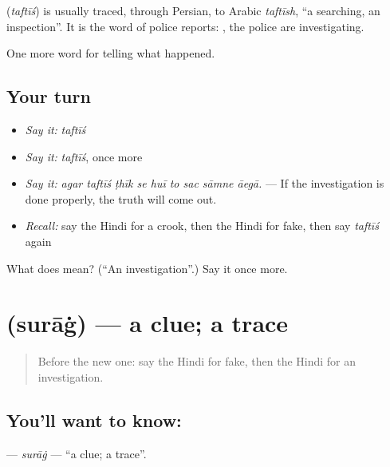 \begin{cousinweb}
\textbf{} (\emph{taftīś}) is usually traced, through Persian, to Arabic \emph{taftīsh}, \textquotedblleft{}a searching, an inspection\textquotedblright{}. It is the word of police reports: \textbf{    }, the police are investigating.
\end{cousinweb}

\begin{grammarlens}[title={What you've built}]
One more word for telling what happened.
\end{grammarlens}

\subsection*{Your turn}
\begin{itemize}
\raggedright
  \item \emph{Say it:} \emph{taftīś}
  \item \emph{Say it:} \emph{taftīś}, once more
  \item \emph{Say it:} \emph{agar taftīś ṭhīk se huī to sac sāmne āegā.} — If the investigation is done properly, the truth will come out.
  \item \emph{Recall:} say the Hindi for a crook, then the Hindi for fake, then say \emph{taftīś} again
\end{itemize}

\begin{tcolorbox}[breakable,colback=teal!4,colframe=teal!35!black,title={Before you move on}]
What does  mean? (\textquotedblleft{}An investigation\textquotedblright{}.) Say it once more.
\end{tcolorbox}
\section[\texorpdfstring{\hi{सुराग़} (surāġ)}{सुराग़ (surāġ)}]{ (surāġ) — a clue; a trace}

\label{lesson:HI-C294-surag}



\begin{quote}
Before the new one: say the Hindi for fake, then the Hindi for an investigation.
\end{quote}

\subsection*{You'll want to know: }
\textbf{} — \emph{surāġ} — \textquotedblleft{}a clue; a trace\textquotedblright{}.

